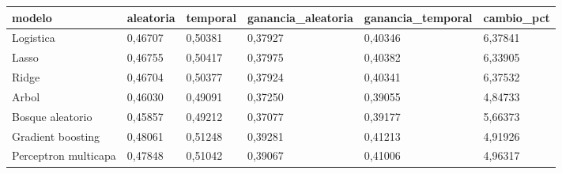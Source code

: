 \begin{tabular}{llllll}
\toprule
modelo & aleatoria & temporal & ganancia\_aleatoria & ganancia\_temporal & cambio\_pct \\
\midrule
Logistica & 0{,}46707 & 0{,}50381 & 0{,}37927 & 0{,}40346 & 6{,}37841 \\
Lasso & 0{,}46755 & 0{,}50417 & 0{,}37975 & 0{,}40382 & 6{,}33905 \\
Ridge & 0{,}46704 & 0{,}50377 & 0{,}37924 & 0{,}40341 & 6{,}37532 \\
Arbol & 0{,}46030 & 0{,}49091 & 0{,}37250 & 0{,}39055 & 4{,}84733 \\
Bosque aleatorio & 0{,}45857 & 0{,}49212 & 0{,}37077 & 0{,}39177 & 5{,}66373 \\
Gradient boosting & 0{,}48061 & 0{,}51248 & 0{,}39281 & 0{,}41213 & 4{,}91926 \\
Perceptron multicapa & 0{,}47848 & 0{,}51042 & 0{,}39067 & 0{,}41006 & 4{,}96317 \\
\bottomrule
\end{tabular}
